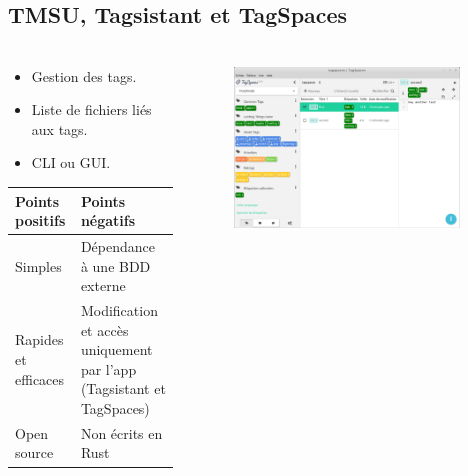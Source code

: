 \documentclass[10pt]{beamer}
\begin{document}
\subsection{TMSU, Tagsistant et TagSpaces}
\begin{frame}
    \frametitle{\subsecname}
    \begin{columns}[T]
        \begin{column}{.4\textwidth}
        \fontsize{8pt}{9}\selectfont
            \begin{center}
                \begin{itemize}
                    \item Gestion des tags.
                    \item Liste de fichiers liés aux tags.
                    \item CLI ou GUI.
                \end{itemize}
                \pause[3]
                \bigbreak
                \begin{tabularx}{5cm}{|p{1.8cm}|X|} \hline
                    \textbf{Points positifs} & \textbf{Points négatifs} \\ \hline
                    Simples & Dépendance à une BDD externe \\ \hline
                    Rapides et efficaces & Modification et accès uniquement par l'app (Tagsistant et TagSpaces) \\ \hline
                    Open source & Non écrits en Rust \\ \hline
                \end{tabularx}
            \end{center}
        \end{column}
        \pause[2]
        \begin{column}{.6\textwidth}
            \begin{flushright}
                \begin{figure}
                    \includegraphics[width=0.95\textwidth]{images/tagspaces.png}
                \end{figure}
            \end{flushright}
        \end{column}
    \end{columns}
\end{frame}
\end{document}
